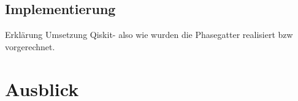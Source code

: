 \documentclass[
  a4paper, %
  10pt, %
  unnumberedsections, %
  twoside, %
]{LTJournalArticle}
\begin{document}
\subsection{\normalsize Implementierung}
Erklärung Umsetzung Qiskit- also wie wurden die Phasegatter realisiert bzw vorgerechnet. 




\section{Ausblick}



\printbibliography %

\end{document}
